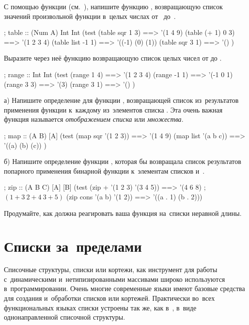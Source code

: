 \begin{Assignment}
С помощью функции  (см.~), напишите функцию , возвращающую список значений произвольной функции  в~целых числах от~ до~.

\begin{Specification}
; table :: (Num \arrow A) Int Int \arrow [A]
(test 
  (table sqr 1 3)    ==> '(1 4 9)
  (table (+ 1) 0 3)  ==> '(1 2 3 4)
  (table list -1 1)  ==> '((-1) (0) (1))
  (table sqr 3 1)    ==> '() )
\end{Specification}

Выразите через неё функцию  возвращающую список целых чисел от  до .
\begin{Specification}
; range :: Int Int \arrow [Int]
(test 
  (range 1 4)   ==> '(1 2 3 4)
  (range -1 1)  ==> '(-1 0 1)
  (range 3 3)   ==> '(3)
  (range 3 1)   ==> '() )
\end{Specification}
\end{Assignment}

\begin{Assignment}
а) Напишите определение для функции , возвращающей список из~результатов применения функции  к~каждому из~элементов списка . Эта очень важная функция называется \emph{отображением списка} или \emph{множества}.
\begin{Specification}
; map :: (A \arrow B) [A] \arrow [B]
(test 
  (map sqr '(1 2 3))  ==> '(1 4 9)
  (map list '(a b c)) ==> '((a) (b) (c)) )
\end{Specification}

б) Напишите определение функции , которая бы возвращала список результатов попарного применения бинарной функции  к~элементам списков  и~.
\begin{Specification}
; zip :: (A B \arrow C) [A] [B] \arrow [C]
(test 
  (zip + '(1 2 3) '(3 4 5)) ==> '(4 6 8)   ;$(1+3\ 2+4\ 3+5)$
  (zip cons '(a b) '(1 2))  ==> '((a . 1) (b . 2)))
\end{Specification}

Продумайте, как должна реагировать ваша функция на~списки неравной длины.
\end{Assignment}

\section{Списки за~пределами~\Scheme}%
Списочные структуры, списки или кортежи, как инструмент для работы с~динамическими и~нетипизированными массивами широко используются в~программировании. Очень многие современные языки имеют базовые средства для создания и~обработки списков или кортежей. Практически во~всех функциональных языках списки устроены так же, как в~\Scheme, в~виде однонаправленной списочной структуры.

